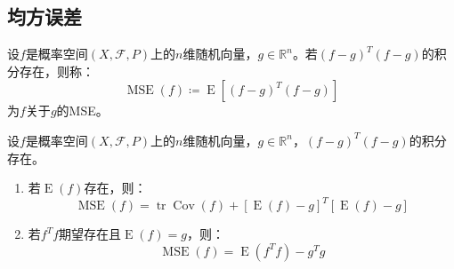 \subsection{均方误差}
\begin{definition}
	设$f$是概率空间$(X,\mathscr{F},P)$上的$n$维随机向量，$g\in\mathbb{R}^{n}$。若$(f-g)^T(f-g)$的积分存在，则称：
	\begin{equation*}
		\operatorname{MSE}(f)\coloneq\operatorname{E}[(f-g)^T(f-g)]
	\end{equation*}
	为$f$关于$g$的\gls{MSE}。
\end{definition}
\begin{property}\label{prop:MSE}
	设$f$是概率空间$(X,\mathscr{F},P)$上的$n$维随机向量，$g\in\mathbb{R}^{n}$，$(f-g)^T(f-g)$的积分存在。
	\begin{enumerate}
		\item 若$\operatorname{E}(f)$存在，则：
		\begin{equation*}
			\operatorname{MSE}(f)=\operatorname{tr}\operatorname{Cov}(f)+[\operatorname{E}(f)-g]^T[\operatorname{E}(f)-g]
		\end{equation*}
		\item 若$f^Tf$期望存在且$\operatorname{E}(f)=g$，则：
		\begin{equation*}
			\operatorname{MSE}(f)=\operatorname{E}(f^Tf)-g^Tg
		\end{equation*}
	\end{enumerate}
\end{property}
